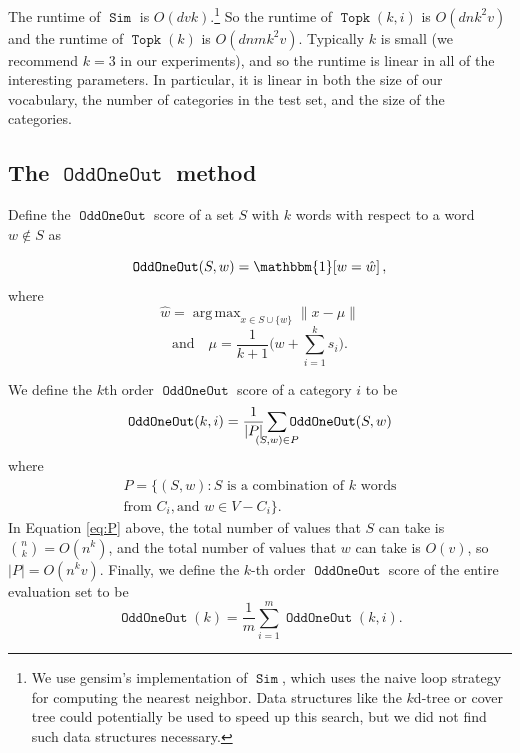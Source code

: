\documentclass[11pt,a4paper]{article}
\newcommand{\ltwo}[1]{\lVert{#1}\rVert}
\newcommand{\indicator}[1]{\mathbbm{1}\!\left[{#1}\right]}
\DeclareMathOperator*{\argmax}{arg\,max}
\DeclareMathOperator{\FindMostSimilar}{\texttt{Sim}}
\DeclareMathOperator{\OddOneOut}{\texttt{OddOneOut}}
\DeclareMathOperator{\topk}{\texttt{Topk}}
\begin{document}
The runtime of $\FindMostSimilar$ is $O(dvk)$.\footnote{
    We use gensim's implementation of $\FindMostSimilar$,
    which uses the naive loop strategy for computing the nearest neighbor.
    Data structures like the $k$d-tree or cover tree could potentially be used to speed up this search,
    but we did not find such data structures necessary.
}
So the runtime of $\topk(k,i)$ is $O(dnk^2v)$
and the runtime of $\topk(k)$ is $O(dnmk^2v)$.
Typically $k$ is small (we recommend $k=3$ in our experiments),
and so the runtime is linear in all of the interesting parameters.
In particular, it is linear in both the size of our vocabulary, the number of categories in the test set, and the size of the categories.

\subsection{The $\OddOneOut$ method}
Define the $\OddOneOut$ score of a set $S$ with $k$ words with respect to a word $w\not\in S$ as


\begin{equation}
    \OddOneOut(S,w) = \indicator{w = \hat w},
\end{equation}
where
\begin{equation}
    \hat w = \argmax_{x \in S\cup\{w\}} \ltwo{x - \mu}
\end{equation}
\begin{equation}
    \text{and}
    \quad
    \mu = \frac1{k+1}\bigg(w + \sum_{i=1}^k{s_i}\bigg)
    .
\end{equation}


We define the $k$th order $\OddOneOut$ score of a category $i$ to be
\begin{equation}
    \OddOneOut(k,i) = \frac 1 {|P|} \sum_{\mathclap{(S,w) \in P}} \OddOneOut(S,w)
    \label{eq:OOOki}
\end{equation}
where
\begin{multline}
    P = \{ (S, w) : S \text{~is a combination of $k$ words}\\\text{from $C_i$}, \text{and~} w \in V-C_i \}
    .
    \label{eq:P}
\end{multline}
In Equation \eqref{eq:P} above,
the total number of values that $S$ can take is ${n \choose k} = O(n^k)$,
and the total number of values that $w$ can take is $O(v)$,
so $|P| = O(n^kv)$.
Finally, we define the $k$-th order $\OddOneOut$ score of the entire evaluation set to be
\begin{equation}
    \OddOneOut(k) = \frac 1 m \sum_{i=1}^m \OddOneOut(k,i)
    .
\end{equation}
\end{document}

